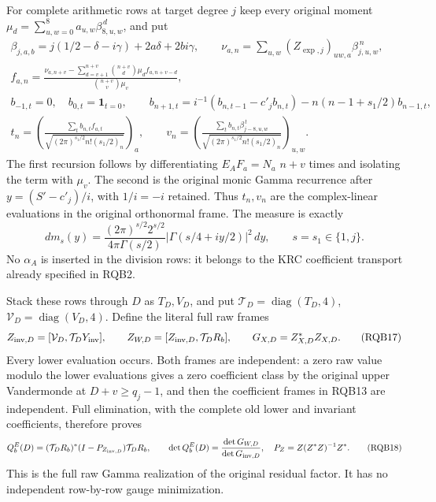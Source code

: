 \documentclass[10pt]{article}
\begin{document}
For complete arithmetic rows at target degree $j$ keep every original
moment $\mu_d=\sum_{u,w=0}^8a_{u,w}\beta_{8,u,w}^{\,d}$, and put
\[
\begin{gathered}
 \beta_{j,a,b}=j(1/2-\delta-i\gamma)+2a\delta+2bi\gamma,\qquad
 \nu_{a,n}=\sum_{u,w}(Z_{\exp,j})_{uw,a}\beta_{j,u,w}^{\,n},\\
 f_{a,n}=
 \frac{\nu_{a,n+v}-\sum_{d=v+1}^{n+v}\binom{n+v}{d}
                       \mu_d f_{a,n+v-d}}
      {\binom{n+v}{v}\mu_v},\\
 b_{-1,t}=0,\quad b_{0,t}=\mathbf1_{t=0},\qquad
 b_{n+1,t}=i^{-1}(b_{n,t-1}-c'_j b_{n,t})
                  -n(n-1+s_1/2)b_{n-1,t},\\
 t_n=\left(\frac{\sum_t b_{n,t}f_{a,t}}
                 {\sqrt{(2\pi)^{s_1/2}n!(s_1/2)_n}}\right)_a,
 \qquad
 v_n=\left(\frac{\sum_t b_{n,t}\beta_{j-8,u,w}^{\,t}}
                 {\sqrt{(2\pi)^{s_1/2}n!(s_1/2)_n}}\right)_{u,w}.
\end{gathered}\tag{RQB16}
\]
The first recursion follows by differentiating $E_AF_a=N_a$
$n+v$ times and isolating the term with $\mu_v$.
The second is the original monic Gamma recurrence after
$y=(S'-c'_j)/i$, with $1/i=-i$ retained. Thus $t_n,v_n$ are the
complex-linear evaluations in the original orthonormal frame.
The measure is exactly
\[
 dm_s(y)=\frac{(2\pi)^{s/2}2^{s/2}}{4\pi\Gamma(s/2)}
                |\Gamma(s/4+iy/2)|^2\,dy ,
 \qquad s=s_1\in\{1,j\}.
\]
No $\alpha_A$ is inserted in the division rows: it belongs to
the KRC coefficient transport already specified in RQB2.

Stack these rows through $D$ as $T_D,V_D$, and put
$\mathcal T_D=\operatorname{diag}(T_D,4)$,
$\mathcal V_D=\operatorname{diag}(V_D,4)$. Define the literal
full raw frames
\[
 Z_{{\rm inv},D}=[\mathcal V_D,\mathcal T_DY_{\rm inv}],
 \qquad
 Z_{W,D}=[Z_{{\rm inv},D},\mathcal T_DR_b],
 \qquad G_{X,D}=Z_{X,D}^*Z_{X,D}.
 \tag{RQB17}
\]
Every lower evaluation occurs. Both frames are independent:
a zero raw value modulo the lower evaluations gives a zero
coefficient class by the original upper Vandermonde at
$D+v\ge q_j-1$, and then the coefficient frames in RQB13
are independent. Full elimination, with the complete old
lower and invariant coefficients, therefore proves
\[
 Q_b^E(D)=(\mathcal T_DR_b)^*
                 (I-P_{Z_{{\rm inv},D}})\mathcal T_DR_b,
 \qquad
 \det Q_b^E(D)=\frac{\det G_{W,D}}{\det G_{{\rm inv},D}},
 \quad P_Z=Z(Z^*Z)^{-1}Z^* .
 \tag{RQB18}
\]
This is the full raw Gamma realization of the original residual
factor. It has no independent row-by-row gauge minimization.
\end{document}
